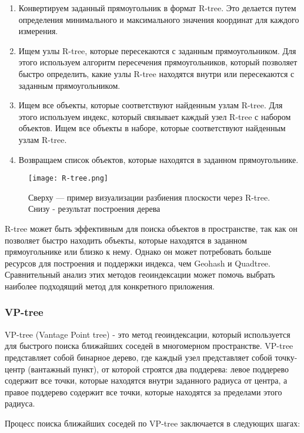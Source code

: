 \begin{enumerate}
    \item Конвертируем заданный прямоугольник в формат R-tree. Это делается путем определения минимального и максимального значения координат для каждого измерения.
    \item Ищем узлы R-tree, которые пересекаются с заданным прямоугольником. Для этого используем алгоритм пересечения прямоугольников, который позволяет быстро определить, какие узлы R-tree находятся внутри или пересекаются с заданным прямоугольником.
    \item Ищем все объекты, которые соответствуют найденным узлам R-tree. Для этого используем индекс, который связывает каждый узел R-tree с набором объектов. Ищем все объекты в наборе, которые соответствуют найденным узлам R-tree.
    \item Возвращаем список объектов, которые находятся в заданном прямоугольнике.
\end{enumerate}

\begin{figure}[h]
    \centering
    \texttt{[image: R-tree.png]}
    \caption{Сверху — пример визуализации разбиения плоскости через R-tree. Снизу - результат построения дерева}
\end{figure}

R-tree может быть эффективным для поиска объектов в пространстве, так как он позволяет быстро находить объекты, которые находятся в заданном прямоугольнике или близко к нему. Однако он может потребовать больше ресурсов для построения и поддержки индекса, чем Geohash и Quadtree. Сравнительный анализ этих методов геоиндексации может помочь выбрать наиболее подходящий метод для конкретного приложения.

\subsubsection{VP-tree}
VP-tree (Vantage Point tree) - это метод геоиндексации, который используется для быстрого поиска ближайших соседей в многомерном пространстве. VP-tree представляет собой бинарное дерево, где каждый узел представляет собой точку-центр (вантажный пункт), от которой строятся два поддерева: левое поддерево содержит все точки, которые находятся внутри заданного радиуса от центра, а правое поддерево содержит все точки, которые находятся за пределами этого радиуса.

Процесс поиска ближайших соседей по VP-tree заключается в следующих шагах:

